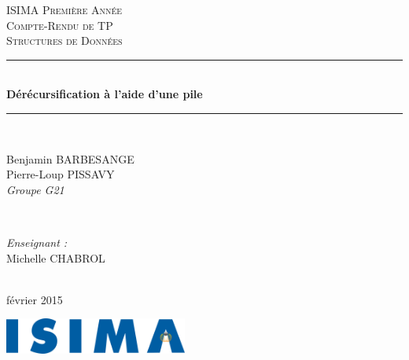\begin{titlepage}
  \newcommand{\HRule}{\rule{\linewidth}{0.5mm}}
  \center
  \null{}
  \vspace{3cm}

  \textsc{\LARGE ISIMA Première Année}\\[1.5cm]
  \textsc{\Large Compte-Rendu de TP}\\[0.5cm]
  \textsc{\LARGE Structures de Données}\\[1.5cm]
  \HRule \\[0.4cm]
  { \huge \bfseries Dérécursification à l'aide d'une pile}\\
  \HRule \\[1.5cm]

  \begin{minipage}{0.4\textwidth}
    \begin{flushleft} \large
      Benjamin BARBESANGE\\
      Pierre-Loup PISSAVY\\
      {\normalsize\textit{Groupe G21}}
    \end{flushleft}
  \end{minipage}
  ~
  \begin{minipage}{0.4\textwidth}
    \begin{flushright} \large
      \emph{Enseignant :} \\
      Michelle CHABROL
    \end{flushright}
  \end{minipage}\\[4cm]

  {\large février 2015}\\[3cm]

  \vfill

  \includegraphics[width=6cm]{settings/ISIMA_logo.pdf}\\[1cm]
\end{titlepage}
